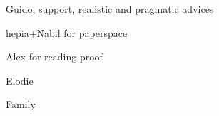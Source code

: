 \documentclass[
11pt, %
english, %
singlespacing, %
liststotoc, %
parskip, %
headsepline, %
]{MastersDoctoralThesis} %
\begin{document}
\begin{acknowledgements}
\addchaptertocentry{\acknowledgementname} %

Guido, support, realistic and pragmatic advices

hepia+Nabil for paperspace

Alex for reading proof

Elodie

Family

\end{acknowledgements}


\tableofcontents %

\listoffigures %

\listoftables %

\end{document}
